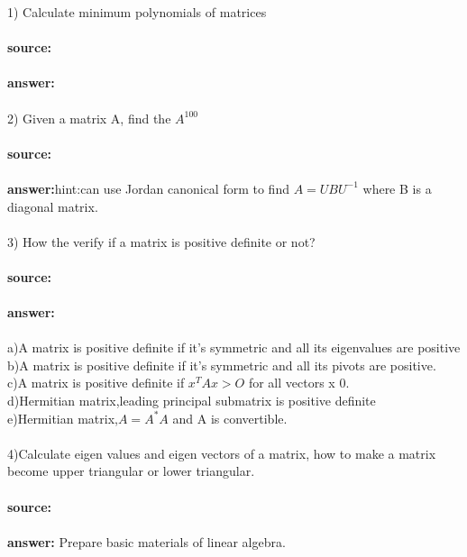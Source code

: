 \documentclass[11pt,fleqn]{book} %
\begin{document}
1) Calculate minimum polynomials of matrices \\\\
\textbf{source:}\\\\
\textbf{answer:}\\\\
2) Given a matrix A, find the $A^{100}$\\\\
\textbf{source:}\\\\
\textbf{answer:}hint:can use Jordan canonical form to find $A=UBU^{-1}$ where B is a diagonal matrix.\\\\
3) How the verify if a matrix is positive definite or not?\\\\
\textbf{source:}\\\\
\textbf{answer:} \\\\
a)A matrix is positive definite if it’s symmetric and all its eigenvalues are positive\\
b)A matrix is positive definite if it’s symmetric and all its pivots are positive.\\
c)A matrix is positive definite if $x^TAx > O$ for all vectors x 0.\\
d)Hermitian matrix,leading principal submatrix is positive definite\\
e)Hermitian matrix,$A=A^*A$ and A is convertible.
\\\\
4)Calculate eigen values and eigen vectors of a matrix, how to make a matrix become upper triangular or lower triangular.\\\\
\textbf{source:}\\\\
\textbf{answer:} Prepare basic materials of linear algebra.\\\\
\end{document}
